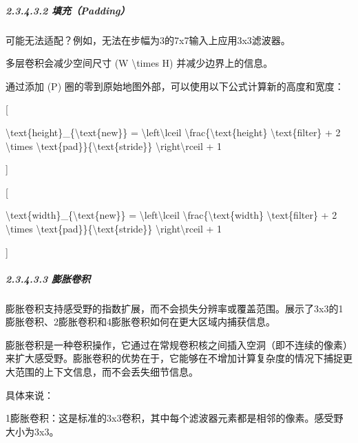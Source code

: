 \subparagraph{\texorpdfstring{\textbf{2.3.4.3.2
填充（Padding）}}{2.3.4.3.2 填充（Padding）}}\label{23432-ux586bux5145padding}

可能无法适配？例如，无法在步幅为3的7x7输入上应用3x3滤波器。

多层卷积会减少空间尺寸 (W \textbackslash times H) 并减少边界上的信息。

通过添加 (P) 圈的零到原始地图外部，可以使用以下公式计算新的高度和宽度：


{[}

\textbackslash text\{height\}\_\{\textbackslash text\{new\}\} =
\textbackslash left\textbackslash lceil
\textbackslash frac\{\textbackslash text\{height\}
\textbackslash text\{filter\} + 2 \textbackslash times
\textbackslash text\{pad\}\}\{\textbackslash text\{stride\}\}
\textbackslash right\textbackslash rceil + 1

{]}

{[}

\textbackslash text\{width\}\_\{\textbackslash text\{new\}\} =
\textbackslash left\textbackslash lceil
\textbackslash frac\{\textbackslash text\{width\}
\textbackslash text\{filter\} + 2 \textbackslash times
\textbackslash text\{pad\}\}\{\textbackslash text\{stride\}\}
\textbackslash right\textbackslash rceil + 1

{]}


\subparagraph{\texorpdfstring{\textbf{2.3.4.3.3
膨胀卷积}}{2.3.4.3.3 膨胀卷积}}\label{23433-ux81a8ux80c0ux5377ux79ef}

膨胀卷积支持感受野的指数扩展，而不会损失分辨率或覆盖范围。展示了3x3的1膨胀卷积、2膨胀卷积和4膨胀卷积如何在更大区域内捕获信息。


膨胀卷积是一种卷积操作，它通过在常规卷积核之间插入空洞（即不连续的像素）来扩大感受野。膨胀卷积的优势在于，它能够在不增加计算复杂度的情况下捕捉更大范围的上下文信息，而不会丢失细节信息。

具体来说：

1膨胀卷积：这是标准的3x3卷积，其中每个滤波器元素都是相邻的像素。感受野大小为3x3。

